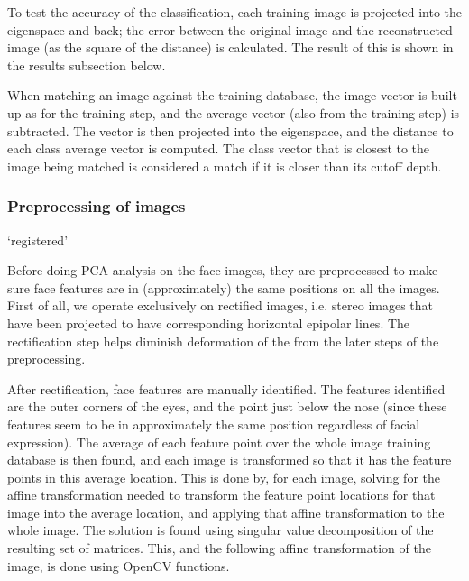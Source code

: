 To test the accuracy of the classification, each training image is projected
into the eigenspace and back; the error between the original image and the
reconstructed image (as the square of the distance) is calculated. The result of
this is shown in the results subsection below.

When matching an image against the training database, the image vector is built
up as for the training step, and the average vector (also from the training
step) is subtracted. The vector is then projected into the eigenspace, and the
distance to each class average vector is computed. The class vector that is
closest to the image being matched is considered a match if it is closer than
its cutoff depth.



\subsubsection{Preprocessing of images}
\label{sec:preprocess}

`registered'

Before doing PCA analysis on the face images, they are preprocessed to make sure
face features are in (approximately) the same positions on all the images. First
of all, we operate exclusively on rectified images, i.e. stereo images that have
been projected to have corresponding horizontal epipolar lines. The
rectification step helps diminish deformation of the from the later steps of the
preprocessing.

After rectification, face features are manually identified. The features
identified are the outer corners of the eyes, and the point just below the nose
(since these features seem to be in approximately the same position regardless
of facial expression). The average of each feature point over the whole image
training database is then found, and each image is transformed so that it has
the feature points in this average location. This is done by, for each image,
solving for the affine transformation needed to transform the feature point
locations for that image into the average location, and applying that affine
transformation to the whole image. The solution is found using singular value
decomposition of the resulting set of matrices. This, and the following affine
transformation of the image, is done using OpenCV functions.

